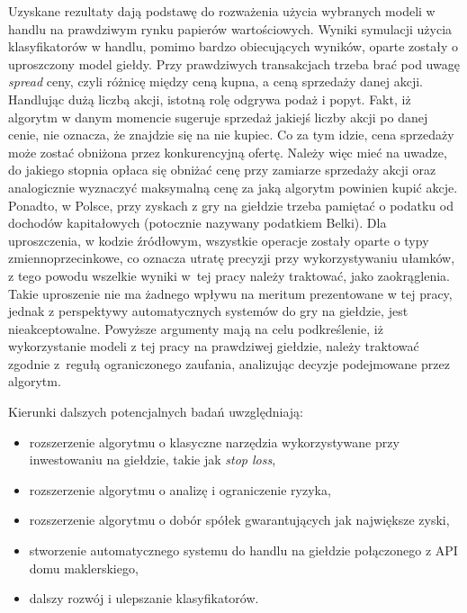 \documentclass[a4paper, twoside, 11pt, openright]{article}
\begin{document}
 Uzyskane rezultaty dają podstawę do rozważenia użycia wybranych modeli w handlu na prawdziwym rynku papierów wartościowych. Wyniki symulacji użycia klasyfikatorów w handlu, pomimo bardzo obiecujących wyników, oparte zostały o uproszczony model giełdy. Przy prawdziwych transakcjach trzeba brać pod uwagę \textit{spread} ceny, czyli różnicę między ceną kupna, a ceną sprzedaży danej akcji. Handlując dużą liczbą akcji, istotną rolę odgrywa podaż i popyt. Fakt, iż algorytm w danym momencie sugeruje sprzedaż jakiejś liczby akcji po danej cenie, nie oznacza, że znajdzie się na nie kupiec. Co za tym idzie, cena sprzedaży może zostać obniżona przez konkurencyjną ofertę. Należy więc mieć na uwadze, do jakiego stopnia opłaca się obniżać cenę przy zamiarze sprzedaży akcji oraz analogicznie wyznaczyć maksymalną cenę za jaką algorytm powinien kupić akcje. Ponadto, w Polsce, przy zyskach z gry na giełdzie trzeba pamiętać o podatku od dochodów kapitałowych (potocznie nazywany podatkiem Belki). Dla uproszczenia, w kodzie źródłowym, wszystkie operacje zostały oparte o typy zmiennoprzecinkowe, co oznacza utratę precyzji przy wykorzystywaniu ułamków, z tego powodu wszelkie wyniki w~tej pracy należy traktować, jako zaokrąglenia. Takie uproszenie nie ma żadnego wpływu na meritum prezentowane w tej pracy, jednak z perspektywy automatycznych systemów do gry na giełdzie, jest nieakceptowalne. Powyższe argumenty mają na celu podkreślenie, iż wykorzystanie modeli z tej pracy na prawdziwej giełdzie, należy traktować zgodnie z~regułą ograniczonego zaufania, analizując decyzje podejmowane przez algorytm.

\bigskip

Kierunki dalszych potencjalnych badań uwzględniają:
\begin{itemize}
	\item rozszerzenie algorytmu o klasyczne narzędzia wykorzystywane przy inwestowaniu na giełdzie, takie jak \textit{stop loss},
	\item rozszerzenie algorytmu o analizę i ograniczenie ryzyka,
	\item rozszerzenie algorytmu o dobór spółek gwarantujących jak największe zyski,
	\item stworzenie automatycznego systemu do handlu na giełdzie połączonego z API domu maklerskiego,
	\item dalszy rozwój i ulepszanie klasyfikatorów.
\end{itemize}

\newpage

\end{document}
